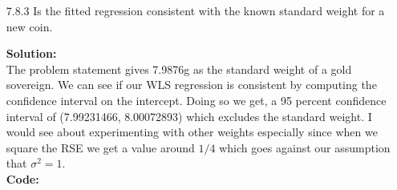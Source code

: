 \documentclass[12pt]{article}
\makeatletter
\theoremstyle{homework}
\newenvironment{exercise}[1]
{\def\@currentlabel{#1}\exercisecore}
{\endexercisecore}
\newcommand{\localhead}[1]{\par\smallskip\noindent\textbf{#1}\nobreak\\}%
\newcommand\solution{\localhead{Solution:}}
\makeatother
\begin{document}
\begin{exercise}{1}
\begin{enumerate}
    \item[7.8.3] Is the fitted regression consistent with the known standard weight for a new coin.\\
    \solution The problem statement gives 7.9876g as the standard weight of a gold sovereign. We can see if our WLS regression is consistent by 
    computing the confidence interval on the intercept. Doing so we get, a 95 percent confidence interval of (7.99231466, 8.00072893) which excludes the 
    standard weight. I would see about experimenting with other weights especially since when we square the RSE we get a value around $1/4$ which goes against our assumption that 
    $\sigma^2 = 1$. \\
    \textbf{Code:}
    \begin{center}
    
    \end{center} 
  \end{enumerate}
\end{exercise}
\newpage
\end{document}
